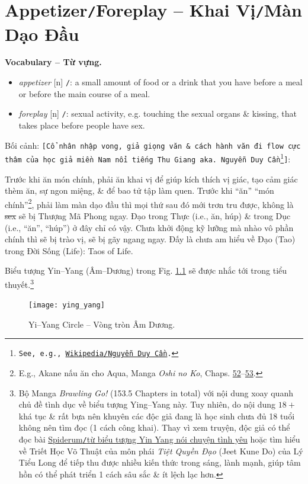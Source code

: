 \documentclass[12pt,twoside]{book}
\begin{document}

\chapter{Appetizer{\tt/}Foreplay -- Khai Vị{\tt/}Màn Dạo Đầu}
\minitoc
\noindent\textbf{\textsf{\small Vocabulary -- Từ vựng.}}
\begin{itemize}\small\sf
	\item {\it appetizer} [n] {\tt/}: a small amount of food or a drink that you have before a meal or before the main course of a meal.
	\item {\it foreplay} [n] {\tt/}: sexual activity, e.g. touching the sexual organs \& kissing, that takes place before people have sex.
\end{itemize}
{\sf Bối cảnh}: {\tt[Cổ nhân nhập vong, giả giọng văn \& cách hành văn đi flow cực thâm của học giả miền Nam nổi tiếng {\sc Thu Giang} aka. {\sc Nguyễn Duy Cần}\footnote{See, e.g., \href{https://vi.wikipedia.org/wiki/Nguyen_Duy_Can}{Wikipedia{\tt/}{\sc Nguyễn Duy Cần}}.}]}:

Trước khi ăn món chính, phải ăn khai vị để giúp kích thích vị giác, tạo cảm giác thèm ăn, sự ngon miệng, \& để bao tử tập làm quen. Trước khi ``ăn'' ``món chính''\footnote{E.g., {\sf Akane} nấu ăn cho {\sf Aqua}, Manga {\it Oshi no Ko}, Chaps. \href{https://readoshino.com/manga/oshi-no-ko-chapter-52/}{52}--\href{https://readoshino.com/manga/oshi-no-ko-chapter-53/}{53}.}, phải làm màn dạo đầu thì mọi thứ sau đó mới trơn tru được, không là \st{sex} sẽ bị Thượng Mã Phong ngay. Đạo trong Thực (i.e., ăn, húp) \& trong Dục (i.e., ``ăn'', ``húp'') ở đây chỉ có vậy. Chưa khởi động kỹ lưỡng mà nhào vô phần chính thì sẽ bị trào vị, sẽ bị gãy ngang ngay. Đấy là chưa am hiểu về Đạo (Tao) trong Đời Sống (Life): Taos of Life.

Biểu tượng Yin--Yang (Âm--Dương) trong Fig. \ref{fig: yin yang} sẽ được nhắc tới trong tiểu thuyết.\footnote{Bộ Manga {\it Brawling Go!} (153.5 Chapters in total) với nội dung xoay quanh chủ đề tình dục về biểu tượng Ying--Yang này. Tuy nhiên, do nội dung $18+$ khá tục \& rất bựa nên khuyên các độc giả đang là học sinh chưa đủ 18 tuổi không nên tìm đọc (1 cách công khai). Thay vì xem truyện, độc giả có thể đọc bài \href{https://spiderum.com/bai-dang/Tu-bieu-tuong-Yin-Yang-noi-chuyen-tinh-yeu-V1x7oz6fQnOg}{Spiderum{\tt/}từ biểu tượng Yin Yang nói chuyện tình yêu} hoặc tìm hiểu về Triết Học Võ Thuật của môn phái {\it Tiệt Quyền Đạo} (Jeet Kune Do) của {\sc Lý Tiểu Long} để tiếp thu được nhiều kiến thức trong sáng, lành mạnh, giúp tâm hồn có thể phát triển 1 cách sâu sắc \& ít lệch lạc hơn.}
\begin{figure}[H]
	\centering
	\texttt{[image: ying\_yang]}
	\caption{Yi--Yang Circle -- Vòng tròn Âm Dương.}
	\label{fig: yin yang}
\end{figure}
\end{document}
